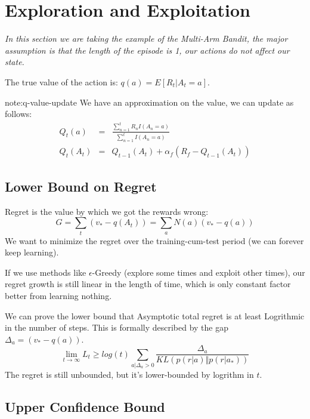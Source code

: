 \section{Exploration and Exploitation}

\emph{In this section we are taking the example of the Multi-Arm Bandit, the major assumption is that the length of the episode is 1, our actions do not affect our state.}

The true value of the action is: $q(a) = E[R_t | A_t = a]$.
\begin{note}{note:q-value-update}
    We have an approximation on the value, we can update as follows:
    \begin{eqnarray}
        Q_t(a) &=& \frac{\sum_{n=1}^{t} R_n I(A_n = a)}{\sum_{n=1}^{t} I(A_n = a)} \\
        Q_t(A_t) &=& Q_{t-1}(A_t) + \alpha_f(R_f - Q_{t-1}(A_t))
    \end{eqnarray}
\end{note}


\subsection{Lower Bound on Regret}

Regret is the value by which we got the rewards wrong:
\begin{equation}
    G = \sum_t (v_* - q(A_t)) = \sum_a N(a) (v_* - q(a))
\end{equation}
We want to minimize the regret over the training-cum-test period (we can forever keep learning).

If we use methods like $\epsilon$-Greedy (explore some times and exploit other times), our regret growth is still linear in the length of time, which is only constant factor better from learning nothing.

We can prove the lower bound that Asymptotic total regret is at least Logrithmic in the number of steps. This is formally described by the gap $\Delta_a = (v_* - q(a))$.
\begin{equation}
    \lim_{t \rightarrow \infty} L_t \geq log(t) \sum_{a \vert \Delta_a > 0} \frac{\Delta_a}{KL(p(r \vert a) \Vert p(r \vert a_*))}
\end{equation}
The regret is still unbounded, but it's lower-bounded by logrithm in $t$.


\subsection{Upper Confidence Bound}

